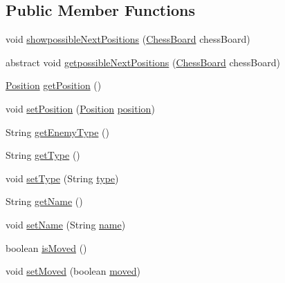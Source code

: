 \subsection*{Public Member Functions}
\begin{DoxyCompactItemize}
\item 
void \hyperlink{classmodel_chess_pieces_1_1_chess_piece_a70a2f0f1a29b9545fcad604df3ad89c2}{showpossible\+Next\+Positions} (\hyperlink{classmodel_core_1_1_chess_board}{Chess\+Board} chess\+Board)
\item 
abstract void \hyperlink{classmodel_chess_pieces_1_1_chess_piece_a920de36744a00c01fde87cb4a12e4dec}{getpossible\+Next\+Positions} (\hyperlink{classmodel_core_1_1_chess_board}{Chess\+Board} chess\+Board)
\item 
\hyperlink{classmodel_core_1_1_position}{Position} \hyperlink{classmodel_chess_pieces_1_1_chess_piece_a6e88271516d06a50162a36321d10ff0e}{get\+Position} ()
\item 
void \hyperlink{classmodel_chess_pieces_1_1_chess_piece_abdd69cca4ca429e531ab58297c0036c7}{set\+Position} (\hyperlink{classmodel_core_1_1_position}{Position} \hyperlink{classmodel_chess_pieces_1_1_chess_piece_a3d4362d5b28f6edb14161196d9c6807d}{position})
\item 
String \hyperlink{classmodel_chess_pieces_1_1_chess_piece_a09214c36497f15c4d85af11a8dd8bfed}{get\+Enemy\+Type} ()
\item 
String \hyperlink{classmodel_chess_pieces_1_1_chess_piece_a189d923d883085ce16d051c161c93e68}{get\+Type} ()
\item 
void \hyperlink{classmodel_chess_pieces_1_1_chess_piece_a7d2fa4377c4409371487f3e5afd5e100}{set\+Type} (String \hyperlink{classmodel_chess_pieces_1_1_chess_piece_a195487ca88c197af7c1604247be31db2}{type})
\item 
String \hyperlink{classmodel_chess_pieces_1_1_chess_piece_ac73d3ae34142cdbf7571a086ffb122c9}{get\+Name} ()
\item 
void \hyperlink{classmodel_chess_pieces_1_1_chess_piece_a86e3e4135360b5bdc7ce9f6bad817b99}{set\+Name} (String \hyperlink{classmodel_chess_pieces_1_1_chess_piece_a03d2fb76fbbff0dab72d00f2173a69ff}{name})
\item 
boolean \hyperlink{classmodel_chess_pieces_1_1_chess_piece_ad6b3bbf9101c70a29ad8087f9431b8ee}{is\+Moved} ()
\item 
void \hyperlink{classmodel_chess_pieces_1_1_chess_piece_a43b4de8cc87600ac934d85cb09c852a1}{set\+Moved} (boolean \hyperlink{classmodel_chess_pieces_1_1_chess_piece_a5bc0722badda5dc066b6a73476fc933c}{moved})
\end{DoxyCompactItemize}

